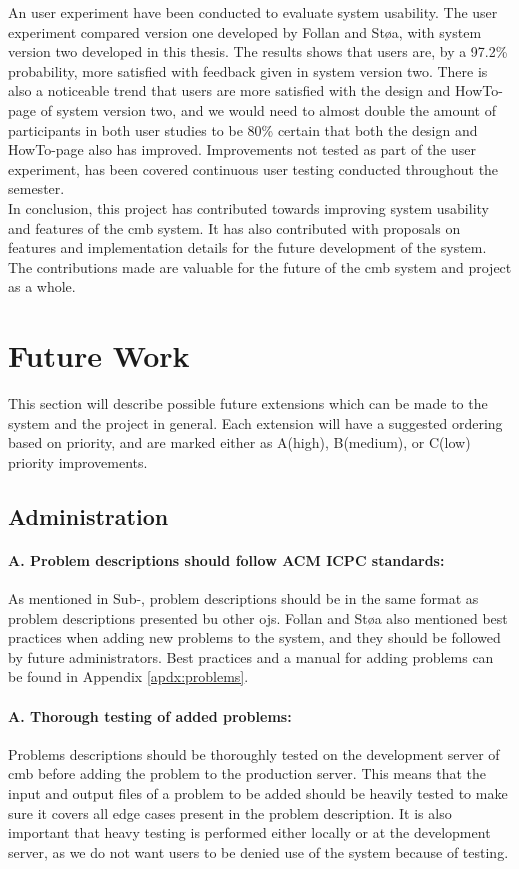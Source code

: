 An user experiment have been conducted to evaluate system usability. The user experiment compared version one developed by Follan and Støa, with system version two developed in this thesis. The results shows that users are, by a 97.2\% probability, more satisfied with feedback given in system version two. There is also a noticeable trend that users are more satisfied with the design and HowTo-page of system version two, and we would need to almost double the amount of participants in both user studies to be 80\% certain that both the design and HowTo-page also has improved. Improvements not tested as part of the user experiment, has been covered continuous user testing conducted throughout the semester. \\

In conclusion, this project has contributed towards improving system usability and features of the \gls{cmb} system. It has also contributed with proposals on features and implementation details for the future development of the system. The contributions made are valuable for the future of the \gls{cmb} system and project as a whole.


\section{Future Work}
\label{sec:future-work}
This section will describe possible future extensions which can be made to the system and the project in general. Each extension will have a suggested ordering based on priority, and are marked either as A(high), B(medium), or C(low) priority improvements.

\subsection*{Administration}

\paragraph*{A. Problem descriptions should follow ACM ICPC standards:} As mentioned in Sub-, problem descriptions should be in the same format as problem descriptions presented bu other \glspl{oj}. Follan and Støa also mentioned best practices when adding new problems to the system, and they should be followed by future administrators. Best practices and a manual for adding problems can be found in Appendix \ref{apdx:problems}.

\paragraph*{A. Thorough testing of added problems:} Problems descriptions should be thoroughly tested on the development server of \gls{cmb} before adding the problem to the production server. This means that the input and output files of a problem to be added should be heavily tested to make sure it covers all edge cases present in the problem description. It is also important that heavy testing is performed either locally or at the development server, as we do not want users to be denied use of the system because of testing.

